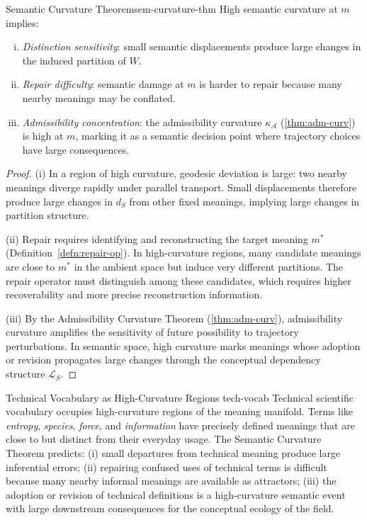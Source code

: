 \documentclass[12pt,twoside,openright]{book}
\newcommand{\adm}{\mathcal{A}}
\begin{document}
\begin{theorem}{Semantic Curvature Theorem}{sem-curvature-thm}
  High semantic curvature at $m$ implies:
  \begin{enumerate}[(i)]
    \item \emph{Distinction sensitivity}: small
          semantic displacements produce large changes
          in the induced partition of $W$.
    \item \emph{Repair difficulty}: semantic damage
          at $m$ is harder to repair because many
          nearby meanings may be conflated.
    \item \emph{Admissibility concentration}: the
          admissibility curvature $\kappa_\adm$
          (\cref{thm:adm-curv}) is high at $m$,
          marking it as a semantic decision point
          where trajectory choices have large
          consequences.
  \end{enumerate}
\end{theorem}

\begin{proof}
  (i) In a region of high curvature, geodesic
  deviation is large: two nearby meanings diverge
  rapidly under parallel transport. Small displacements
  therefore produce large changes in $d_S$ from other
  fixed meanings, implying large changes in partition
  structure.

  (ii) Repair requires identifying and reconstructing
  the target meaning $m^*$
  (Definition~\ref{defn:repair-op}).
  In high-curvature regions, many candidate meanings
  are close to $m^*$ in the ambient space but induce
  very different partitions. The repair operator must
  distinguish among these candidates, which requires
  higher recoverability and more precise reconstruction
  information.

  (iii) By the Admissibility Curvature Theorem
  (\cref{thm:adm-curv}), admissibility curvature
  amplifies the sensitivity of future possibility to
  trajectory perturbations. In semantic space, high
  curvature marks meanings whose adoption or revision
  propagates large changes through the conceptual
  dependency structure $\mathcal{L}_S$.
\end{proof}

\begin{example}{Technical Vocabulary as High-Curvature Regions}%
  {tech-vocab}
  Technical scientific vocabulary occupies high-curvature
  regions of the meaning manifold.
  Terms like \emph{entropy}, \emph{species},
  \emph{force}, and \emph{information} have precisely
  defined meanings that are close to but distinct from
  their everyday usage.
  The Semantic Curvature Theorem predicts:
  (i) small departures from technical meaning
  produce large inferential errors;
  (ii) repairing confused uses of technical terms
  is difficult because many nearby informal meanings
  are available as attractors;
  (iii) the adoption or revision of technical
  definitions is a high-curvature semantic event
  with large downstream consequences for the
  conceptual ecology of the field.
\end{example}
\end{document}
